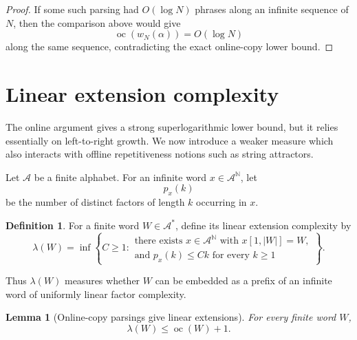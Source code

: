 \documentclass[11pt]{amsart}
\newtheorem{lemma}[theorem]{Lemma}
\theoremstyle{definition}
\newtheorem{definition}[theorem]{Definition}
\DeclareMathOperator{\oc}{oc}
\begin{document}
\begin{proof}
If some such parsing had \(O(\log N)\) phrases along an infinite sequence of \(N\), then the comparison above would give
\[
\oc(w_N(\alpha))=O(\log N)
\]
along the same sequence, contradicting the exact online-copy lower bound.
\end{proof}

\section{Linear extension complexity}

The online argument gives a strong superlogarithmic lower bound, but it relies essentially on left-to-right growth. We now introduce a weaker measure which also interacts with offline repetitiveness notions such as string attractors.

Let \(\mathcal A\) be a finite alphabet. For an infinite word \(x\in\mathcal A^{\mathbb N}\), let
\[
p_x(k)
\]
be the number of distinct factors of length \(k\) occurring in \(x\).

\begin{definition}
For a finite word \(W\in\mathcal A^*\), define its linear extension complexity by
\[
\lambda(W)
=
\inf\left\{
C\geq 1:
\begin{array}{l}
\text{there exists }x\in\mathcal A^{\mathbb N}\text{ with }x[1,|W|]=W,\\
\text{and }p_x(k)\leq Ck\text{ for every }k\geq 1
\end{array}
\right\}.
\]
\end{definition}

Thus \(\lambda(W)\) measures whether \(W\) can be embedded as a prefix of an infinite word of uniformly linear factor complexity.

\begin{lemma}[Online-copy parsings give linear extensions]
For every finite word \(W\),
\[
\lambda(W)\leq \oc(W)+1.
\]
\end{lemma}
\end{document}
